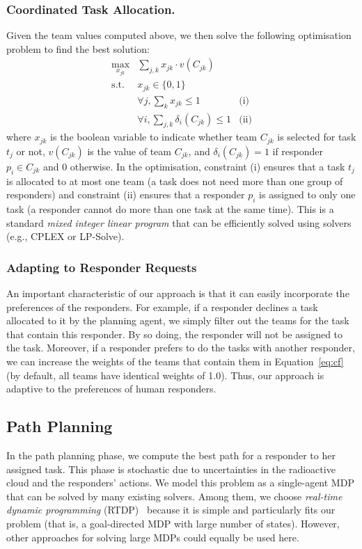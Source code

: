 \subsubsection{Coordinated Task Allocation.}
Given the team values computed above, we then solve the following
optimisation problem to find the best solution:
\begin{equation}
  \begin{array}{lll}
    \max\limits_{x_{jk}} & \sum_{j, k} x_{jk} \cdot v(C_{jk}) & \\[2pt]
    \mbox{s.t.} & x_{jk} \in \{0, 1\} & \\[2pt]
    & \forall j, \sum_{k} x_{jk} \leq 1 & \mbox{(i)} \\[2pt]
    & \forall i, \sum_{j, k} \delta_i(C_{jk}) \leq 1 & \mbox{(ii)}
  \end{array}
  \label{eq:cf}
\end{equation}
where $x_{jk}$ is the boolean variable to indicate whether team
$C_{jk}$ is selected for task $t_j$ or not, $v(C_{jk})$ is the
value of team $C_{jk}$, and $\delta_i(C_{jk}) = 1$ if responder
$p_i\in C_{jk}$ and 0 otherwise. In the optimisation, constraint
(i) ensures that a task $t_j$ is allocated to at most one team (a
task does not need more than one group of responders) and
constraint (ii) ensures that a responder $p_i$ is assigned to only
one task (a responder cannot do more than one task at the same
time). This is a standard {\em mixed integer linear program} that
can be efficiently solved using solvers (e.g., CPLEX or LP-Solve).

\subsubsection{Adapting to Responder Requests}\label{sec:adaptive}
An important characteristic of our approach is that it can easily
incorporate the preferences of the responders. For example, if a
responder declines a task allocated to it by the planning agent, we
simply filter out the teams for the task that contain this
responder. By so doing, the responder will not be assigned to the
task. Moreover, if a responder prefers to do the tasks with another
responder, we can increase the weights of the teams that contain
them in Equation~\ref{eq:cf} (by default, all teams have identical
weights of 1.0). Thus, our approach is adaptive to the
 preferences of human responders.\vspace{-2mm}

\subsection{Path Planning}
\label{sec:pathplanning}
In the path planning phase, we compute the best path for a
responder to her assigned task. This phase is stochastic due to uncertainties in the radioactive cloud and the responders'
actions. We model this problem as a single-agent MDP that can be
solved by many existing solvers. Among them, we choose {\em
real-time dynamic programming} (RTDP)~\cite{barto1995learning}
because it is simple and particularly fits our problem (that is, a goal-directed MDP with large number of states). However, other
approaches for solving large MDPs  could equally be used here.

